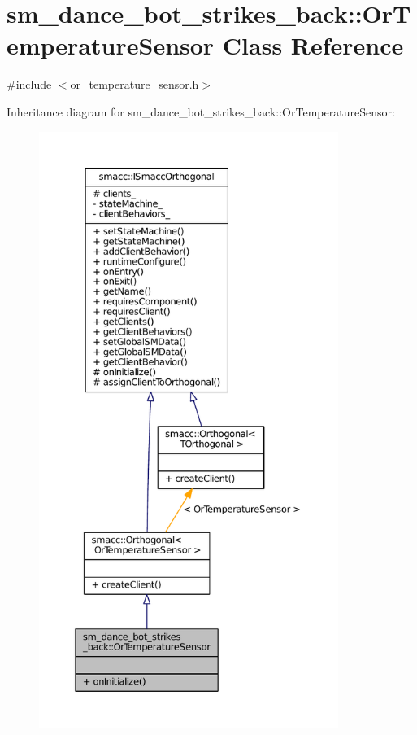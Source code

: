 \hypertarget{classsm__dance__bot__strikes__back_1_1OrTemperatureSensor}{}\section{sm\+\_\+dance\+\_\+bot\+\_\+strikes\+\_\+back\+:\+:Or\+Temperature\+Sensor Class Reference}
\label{classsm__dance__bot__strikes__back_1_1OrTemperatureSensor}


{\ttfamily \#include $<$or\+\_\+temperature\+\_\+sensor.\+h$>$}



Inheritance diagram for sm\+\_\+dance\+\_\+bot\+\_\+strikes\+\_\+back\+:\+:Or\+Temperature\+Sensor\+:
\nopagebreak
\begin{figure}[H]
\begin{center}
\leavevmode
\includegraphics[height=550pt]{classsm__dance__bot__strikes__back_1_1OrTemperatureSensor__inherit__graph}
\end{center}
\end{figure}


